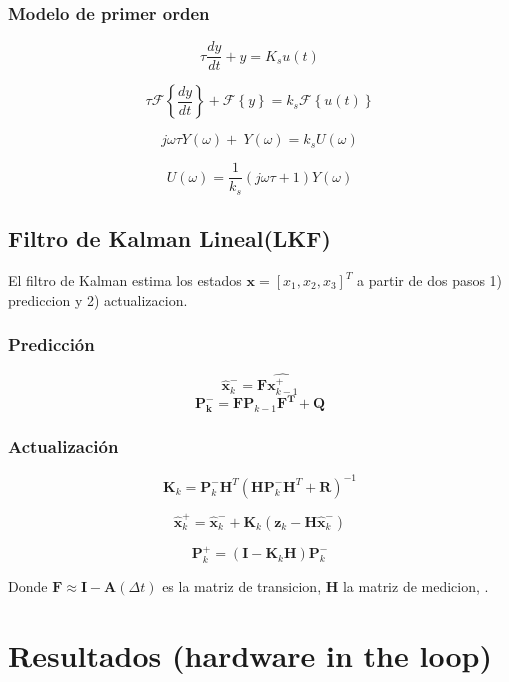 \documentclass[conference]{IEEEtran}
\begin{document}
\subsubsection{Modelo de primer orden}

\[
	\tau \frac{dy}{dt} + y = K_s u(t)
\]

\[
	\tau \mathcal{F}\left\{\frac{dy}{dt}\right\} + \mathcal{F} \left\{y\right\} = k_s \mathcal{F} \left\{u(t) \right\}
\]

\[
	 j\omega \tau  Y(\omega) + \ Y(\omega) = k_s U(\omega)
\]

\[
	U(\omega) = \frac{1}{k_s} (j\omega \tau + 1) Y(\omega)
\]

\subsection{Filtro de Kalman Lineal(LKF)}

El filtro de Kalman estima los estados $\textbf{x} = [x_1, x_2, x_3]^T$ a partir de dos pasos 1) prediccion y 2) actualizacion.



\subsubsection{Predicci\'on}


\[
\hat{\mathbf{x}}_k^- = \mathbf{F}\hat{\mathbf{x}^+_{k-1}}
\]
\[
\mathbf{P^-_k} = \mathbf{F} \mathbf{P}_{k-1} \mathbf{F^T} + \mathbf{Q}
\]

\subsubsection{Actualizaci\'on}

\[
\mathbf{K}_k = \mathbf{P}_k^- \mathbf{H}^T \left( \mathbf{H} \mathbf{P}_k^- \mathbf{H}^T + \mathbf{R} \right)^{-1}
\]

\[
\hat{\mathbf{x}}_k^+ = \hat{\mathbf{x}}_k^- + \mathbf{K}_k \left( \mathbf{z}_k - \mathbf{H} \hat{\mathbf{x}}_k^- \right)
\]

\[
\mathbf{P}_k^+ = \left( \mathbf{I} - \mathbf{K}_k \mathbf{H} \right) \mathbf{P}_k^-
\]

Donde $\mathbf{F}\approx \mathbf{I} - \mathbf{A}(\Delta t) $ es la matriz de transicion, $\mathbf{H}$  la matriz de medicion, .





\section{Resultados (hardware in the loop)}
\end{document}
